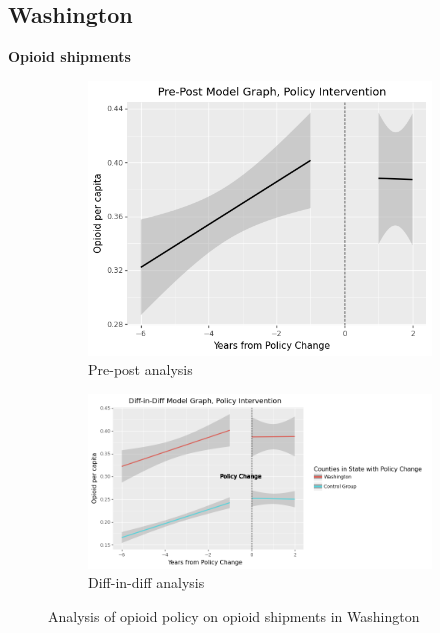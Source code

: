 \documentclass[12pt,letterpaper]{article}
\begin{document}
\subsection{Washington}
\textbf{Opioid shipments}

\begin{figure}[!h]
\centering
\begin{subfigure}{.5\textwidth}
  \centering
  \includegraphics[width=0.7\linewidth]{../30_results/General_Results/washington_opioid_shipment_prepost.png}
  \caption{Pre-post analysis}
  \label{fig:wa_ship_prepost}
\end{subfigure}%
\begin{subfigure}{.55\textwidth}
  \centering
  \includegraphics[width=1\linewidth]{../30_results/General_Results/washington_opioid_shipment_diffdiff.png}
  \caption{Diff-in-diff analysis}
  \label{fig:wa_ship_did}
\end{subfigure}
\caption{Analysis of opioid policy on opioid shipments in Washington}
\label{fig:wa_ship}
\end{figure}
\end{document}

